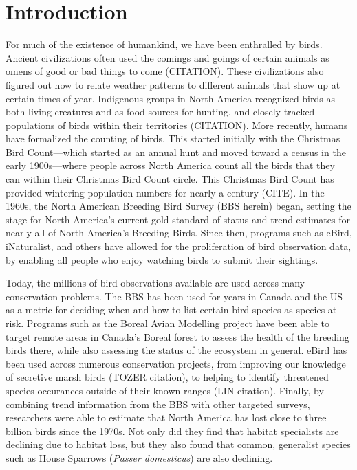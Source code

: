 \chapter{Introduction}

\par For much of the existence of humankind, we have been enthralled by birds.
Ancient civilizations often used the comings and goings of certain animals as omens of good or bad things to come (CITATION).
These civilizations also figured out how to relate weather patterns to different animals that show up at certain times of year.
Indigenous groups in North America recognized birds as both living creatures and as food sources for hunting, and closely tracked populations of birds within their territories (CITATION).
More recently, humans have formalized the counting of birds.
This started initially with the Christmas Bird Count---which started as an annual hunt and moved toward a census in the early 1900s---where people across North America count all the birds that they can within their Christmas Bird Count circle.
This Christmas Bird Count has provided wintering population numbers for nearly a century (CITE).
In the 1960s, the North American Breeding Bird Survey (BBS herein) began, setting the stage for North America's current gold standard of status and trend estimates for nearly all of North America's Breeding Birds.
Since then, programs such as eBird, iNaturalist, and others have allowed for the proliferation of bird observation data, by enabling all people who enjoy watching birds to submit their sightings.

\par Today, the millions of bird observations available are used across many conservation problems.
The BBS has been used for years in Canada and the US as a metric for deciding when and how to list certain bird species as species-at-risk.
Programs such as the Boreal Avian Modelling project have been able to target remote areas in Canada's Boreal forest to assess the health of the breeding birds there, while also assessing the status of the ecosystem in general.
eBird has been used across numerous conservation projects, from improving our knowledge of secretive marsh birds (TOZER citation), to helping to identify threatened species occurances outside of their known ranges (LIN citation).
Finally, by combining trend information from the BBS with other targeted surveys, researchers were able to estimate that North America has lost close to three billion birds since the 1970s.
Not only did they find that habitat specialists are declining due to habitat loss, but they also found that common, generalist species such as House Sparrows (\textit{Passer domesticus}) are also declining.

